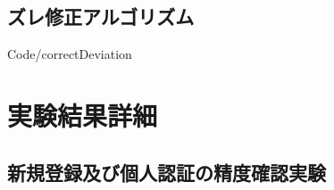 \documentclass[12pt]{jreport}
\renewcommand{\slash}{/}
\begin{document}
    \section{ズレ修正アルゴリズム}
    
    {Code\slash correctDeviation}

\chapter{実験結果詳細}
\section{新規登録及び個人認証の精度確認実験}
\label{detail}
\end{document}
